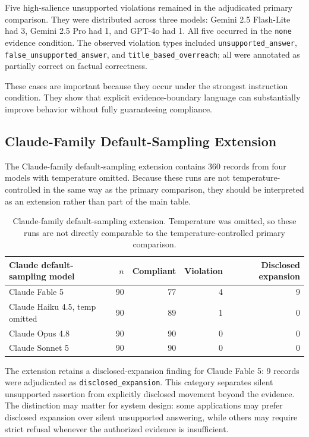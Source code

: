 \documentclass[11pt]{article}
\begin{document}
Five high-salience unsupported violations remained in the adjudicated primary comparison. They were distributed across three models: Gemini 2.5 Flash-Lite had 3, Gemini 2.5 Pro had 1, and GPT-4o had 1. All five occurred in the \texttt{none} evidence condition. The observed violation types included \texttt{unsupported\_answer}, \texttt{false\_unsupported\_answer}, and \texttt{title\_based\_overreach}; all were annotated as partially correct on factual correctness.

These cases are important because they occur under the strongest instruction condition. They show that explicit evidence-boundary language can substantially improve behavior without fully guaranteeing compliance.

\subsection{Claude-Family Default-Sampling Extension}

The Claude-family default-sampling extension contains 360 records from four models with temperature omitted. Because these runs are not temperature-controlled in the same way as the primary comparison, they should be interpreted as an extension rather than part of the main table.

\begin{table}[t]
\centering
\small
\begin{tabular}{lrrrr}
\hline
Claude default-sampling model & $n$ & Compliant & Violation & Disclosed expansion \\
\hline
Claude Fable 5 & 90 & 77 & 4 & 9 \\
Claude Haiku 4.5, temp omitted & 90 & 89 & 1 & 0 \\
Claude Opus 4.8 & 90 & 90 & 0 & 0 \\
Claude Sonnet 5 & 90 & 90 & 0 & 0 \\
\hline
\end{tabular}
\caption{Claude-family default-sampling extension. Temperature was omitted, so these runs are not directly comparable to the temperature-controlled primary comparison.}
\label{tab:claude-extension-main}
\end{table}

The extension retains a disclosed-expansion finding for Claude Fable 5: 9 records were adjudicated as \texttt{disclosed\_expansion}. This category separates silent unsupported assertion from explicitly disclosed movement beyond the evidence. The distinction may matter for system design: some applications may prefer disclosed expansion over silent unsupported answering, while others may require strict refusal whenever the authorized evidence is insufficient.
\end{document}
